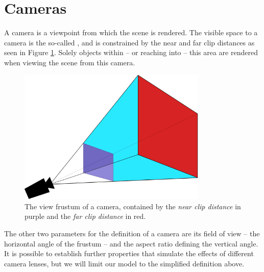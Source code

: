 \section{Cameras}

	A camera is a viewpoint from which the scene is rendered. The visible space to a camera is the so-called \cite{Lengyel:2003:MGP:996316}, and is constrained by the near and far clip distances as seen in Figure \ref{fig:CameraFrustum}. Solely objects within -- or reaching into -- this area are rendered when viewing the scene from this camera.

	\begin{figure}[htbp]
		\centering
		\includegraphics[width=9cm]{images/frustum.png}
		\caption{The view frustum of a camera, contained by the \emph{near clip distance} in purple and the \emph{far clip distance} in red.}
		\label{fig:CameraFrustum}
	\end{figure}

	The other two parameters for the definition of a camera are its field of view -- the horizontal angle of the frustum -- and the aspect ratio defining the vertical angle. It is possible to establish further properties that simulate the effects of different camera lenses\cite{Kolb:1995:RCM:218380.218463}, but we will limit our model to the simplified definition above.

